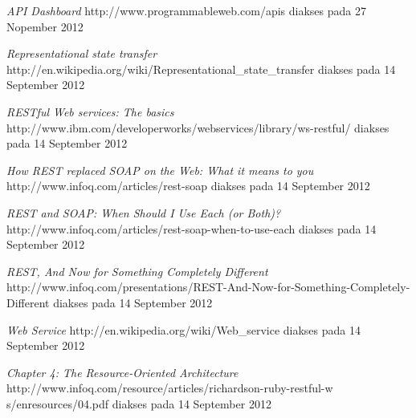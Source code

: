 \documentclass[a4paper, 12pt]{report}
\begin{document}
\begin{thebibliography}{99}

  \emph{API Dashboard}
  http://www.programmableweb.com/apis
  diakses pada 27 Nopember 2012

  \emph{Representational state transfer}
  http://en.wikipedia.org/wiki/Representational\_state\_transfer
  diakses pada 14 September 2012 

  \emph{RESTful Web services: The basics}
  http://www.ibm.com/developerworks/webservices/library/ws-restful/
  diakses pada 14 September 2012
  
  \emph{How REST replaced SOAP on the Web: What it means to you}
  http://www.infoq.com/articles/rest-soap
  diakses pada 14 September 2012
  
  \emph{REST and SOAP: When Should I Use Each (or Both)?}
  http://www.infoq.com/articles/rest-soap-when-to-use-each
  diakses pada 14 September 2012
  
  \emph{REST, And Now for Something Completely Different}
  http://www.infoq.com/presentations/REST-And-Now-for-Something-Completely-Different
  diakses pada 14 September 2012
  
  \emph{Web Service}
  http://en.wikipedia.org/wiki/Web\_service
  diakses pada 14 September 2012
  
  \emph{Chapter 4: The Resource-Oriented Architecture}
  http://www.infoq.com/resource/articles/richardson-ruby-restful-w  s/enresources/04.pdf
  diakses pada 14 September 2012

\end{thebibliography}
\end{document}
